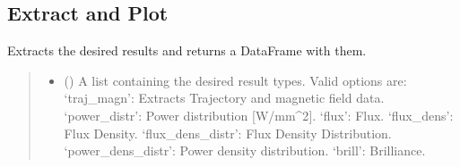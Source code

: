 \documentclass[letterpaper,10pt,english]{sphinxmanual}
\begin{document}
\subsection{Extract and Plot}
\label{\detokenize{API:extract-and-plot}}

\begin{fulllineitems}
\label{\detokenize{API:wavepy.extract_plot_results.ExtractAndPlot}}
\pysigstartsignatures
{}
\pysigstopsignatures{}

\begin{fulllineitems}
\label{\detokenize{API:wavepy.extract_plot_results.ExtractAndPlot.extract_wave_results}}
\pysigstartsignatures
{}
\pysigstopsignatures
\sphinxAtStartPar
Extracts the desired results and returns a DataFrame with them.
\begin{quote}\begin{description}
\begin{itemize}
\item {} 
\sphinxAtStartPar
{} () \textendash{} A list containing the desired result types. Valid options are:
\sphinxhyphen{} ‘traj\_magn’: Extracts Trajectory and magnetic field data.
\sphinxhyphen{} ‘power\_distr’: Power distribution {[}W/mm\textasciicircum{}2{]}.
\sphinxhyphen{} ‘flux’: Flux.
\sphinxhyphen{} ‘flux\_dens’: Flux Density.
\sphinxhyphen{} ‘flux\_dens\_distr’: Flux Density Distribution.
\sphinxhyphen{} ‘power\_dens\_distr’: Power density distribution.
\sphinxhyphen{} ‘brill’: Brilliance.


\end{itemize}
\end{description}
\end{quote}
\end{fulllineitems}
\end{fulllineitems}
\end{document}
